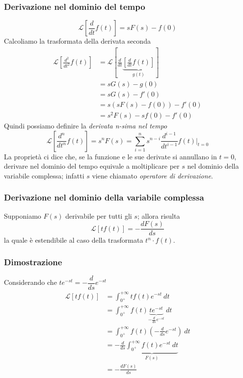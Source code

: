 \documentclass{article}
\numberwithin{equation}{subsection}
\begin{document}
\subsubsection{Derivazione nel dominio del tempo}\label{Derivazione nel dominio del tempo}
\begin{equation}
    \mathcal{L}\left[\frac{d}{dt}f(t)\right] = sF(s) - f(0)
\end{equation}
Calcoliamo la trasformata della derivata seconda
\begin{align*}
    \mathcal{L}\left[\frac{d^2}{dt^2}f(t)\right] &=
    \mathcal{L}\left[\frac{d}{dt}\underbrace{\left[\frac{d}{dt}f(t)\right]}_{g(t)}\right]\\
    &=sG(s) - g(0)\\
    &=sG(s) - f'(0)\\
    &=s(sF(s)-f(0)) - f'(0)\\
    &= s^2 F(s) - sf(0) - f'(0)
\end{align*}
Quindi possiamo definire la \textit{derivata n-sima nel tempo}
\begin{equation}
    \mathcal{L}\left[\frac{d^n}{dt^n}f(t)\right] = s^nF(s) = \sum_{i=1}^n s^{n-i} \frac{d^{i-1}}{dt^{i-1}}f(t)|_{t=0}
\end{equation}
La proprietà ci dice che, se la funzione e le sue derivate si annullano in $t=0$, derivare nel dominio del tempo equivale a moltiplicare per $s$ nel dominio della variabile complessa; infatti $s$ viene chiamato \textit{operatore di derivazione}.


\subsubsection{Derivazione nel dominio della variabile complessa}\label{Derivazione nel dominio della variabile complessa}
Supponiamo $F(s)$ derivabile per tutti gli $s$; allora risulta
\begin{equation}
    \mathcal{L}[t f(t)] = - \frac{dF(s)}{ds}
\end{equation}
la quale è estendibile al caso della trasformata $t^n \cdot f(t)$.

\subsubsection*{Dimostrazione}
Considerando che $te^{-st} = -\dfrac{d}{ds}e^{-st}$
\begin{align*}
    \mathcal{L}[t f(t)] &= \int_{0^+}^{+\infty} t f(t)e^{-st} \ dt\\
    &=\int_{0^+}^{+\infty} f(t) \underbrace{te^{-st}}_{-\frac{d}{ds}e^{-st}} \ dt\\
    &=\int_{0^+}^{+\infty} f(t) \left(-\frac{d}{ds}e^{-st}\right) \ dt\\
    &=-\frac{d}{ds} \underbrace{\int_{0^+}^{+\infty} f(t) e^{-st} \ dt}_{F(s)}\\
    &= - \frac{dF(s)}{ds}
\end{align*}
\end{document}
